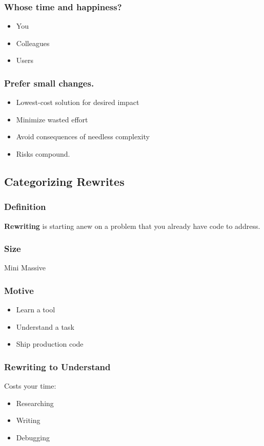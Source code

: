 \documentclass{beamer}
\begin{document}
\begin{frame}[fragile]
\frametitle{Whose time and happiness?}
\begin{itemize}
\item You
\item Colleagues
\item Users
\end{itemize}
\end{frame}

\begin{frame}[fragile]
\frametitle{Prefer small changes.}
\begin{itemize}
\item Lowest-cost solution for desired impact
\item Minimize wasted effort
\item Avoid consequences of needless complexity
\item Risks compound.
\end{itemize}
\end{frame}


\subsection{Categorizing Rewrites}

\begin{frame}[fragile]
\frametitle{Definition}
\textbf{Rewriting} is starting anew on a problem that you already have code to
address.
\end{frame}

\begin{frame}[fragile]
\frametitle{Size}
Mini \hrulefill Massive
\end{frame}

\begin{frame}[fragile]
\frametitle{Motive}
\begin{itemize}
\item Learn a tool
\item Understand a task
\item Ship production code
\end{itemize}
\end{frame}

\begin{frame}[fragile]
\frametitle{Rewriting to Understand}
Costs your time:
\begin{itemize}
\item Researching
\item Writing
\item Debugging
\end{itemize}
\end{frame}
\end{document}
